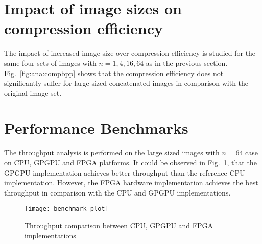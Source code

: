 
\section{Impact of image sizes on compression efficiency}
The impact of increased image size over compression efficiency is studied for the same four sets of images with $n=1,4,16,64$ as in the previous section. Fig.~\ref{fig:ana:compbpp} shows that the compression efficiency does not significantly suffer for large-sized concatenated images in comparison with the original image set.

\section{Performance Benchmarks}
The throughput analysis is performed on the large sized images with $n=64$ case on CPU, GPGPU and FPGA platforms. It could be observed in Fig.~\ref{fig:benchmarks:plot}, that the GPGPU implementation achieves better throughput than the reference CPU implementation. However, the FPGA hardware implementation \cite{Manthey2014} achieves the best throughput in comparison with the CPU and GPGPU implementations. 
\begin{figure}[t]
  \centering
  \texttt{[image: benchmark\_plot]}
  \caption{Throughput comparison between CPU, GPGPU and FPGA implementations}
  \label{fig:benchmarks:plot}
\end{figure}

